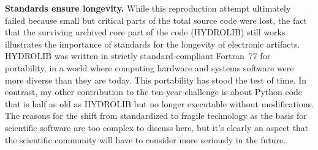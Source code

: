 \vspace{2mm}
\textbf{Standards ensure longevity.} While this reproduction attempt ultimately failed because small but critical parts of the total source code were lost, the fact that the surviving archived core part of the code (HYDROLIB) still works illustrates the importance of standards for the longevity of electronic artifacts. HYDROLIB was written in strictly standard-compliant Fortran~77 for portability, in a world where computing hardware and systems software were more diverse than they are today. This portability has stood the test of time. In contrast, my other contribution to the ten-year-challenge \cite{HinsenRpStructuralflexibility2020} is about Python code that is half as old as HYDROLIB but no longer executable without modifications. The reasons for the shift from standardized to fragile technology as the basis for scientific software are too complex to discuss here, but it's clearly an aspect that the scientific community will have to consider more seriously in the future.

